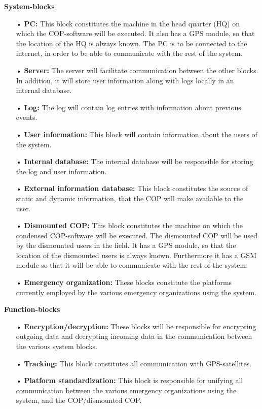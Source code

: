 \textbf{System-blocks}
\begin{enumerate}
\item[•] \textbf{PC:} This block constitutes the machine in the head quarter (HQ) on which the COP-software will be executed. It also has a GPS module, so that the location of the HQ is always known. The PC is to be connected to the internet, in order to be able to communicate with the rest of the system.
\item[•] \textbf{Server:} The server will facilitate communication between the other blocks. In addition, it will store user information along with logs locally in an internal database.
\item[•] \textbf{Log:} The log will contain log entries with information about previous events.
\item[•] \textbf{User information:} This block will contain information about the users of the system.
\item[•] \textbf{Internal database:} The internal database will be responsible for storing the log and user information.
\item[•] \textbf{External information database:} This block constitutes the source of static and dynamic information, that the COP will make available to the user.
\item[•] \textbf{Dismounted COP:} This block constitutes the machine on which the condensed COP-software will be executed. The dismounted COP will be used by the dismounted users in the field. It has a GPS module, so that the location of the dismounted users is always known. Furthermore it has a GSM module so that it will be able to communicate with the rest of the system.
\item[•] \textbf{Emergency organization:} These blocks constitute the platforms currently employed by the various emergency organizations using the system.
\end{enumerate}


\textbf{Function-blocks}
\begin{enumerate}
\item[•] \textbf{Encryption/decryption:} These blocks will be responsible for encrypting outgoing data and decrypting incoming data in the communication between the various system blocks.
\item[•] \textbf{Tracking:} This block constitutes all communication with GPS-satellites.
\item[•] \textbf{Platform standardization:} This block is responsible for unifying all communication between the various emergency organizations using the system, and the COP/dismounted COP.
\end{enumerate}